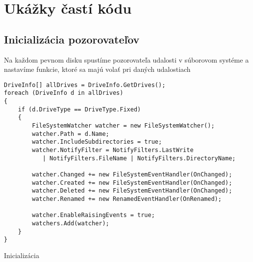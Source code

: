 
\section{Ukážky častí kódu}

\subsection{Inicializácia pozorovateľov}
Na každom pevnom disku spustíme pozorovateľa udalosti v súborovom systéme a nastavíme funkcie, ktoré sa majú volať pri daných udalostiach
\begin{listing}
\begin{verbatim}
DriveInfo[] allDrives = DriveInfo.GetDrives();
foreach (DriveInfo d in allDrives)
{
    if (d.DriveType == DriveType.Fixed) 
    { 
        FileSystemWatcher watcher = new FileSystemWatcher();
        watcher.Path = d.Name;
        watcher.IncludeSubdirectories = true;
        watcher.NotifyFilter = NotifyFilters.LastWrite
           | NotifyFilters.FileName | NotifyFilters.DirectoryName;

        watcher.Changed += new FileSystemEventHandler(OnChanged);
        watcher.Created += new FileSystemEventHandler(OnChanged);
        watcher.Deleted += new FileSystemEventHandler(OnChanged);
        watcher.Renamed += new RenamedEventHandler(OnRenamed);

        watcher.EnableRaisingEvents = true;
        watchers.Add(watcher);
    }
}         
\end{verbatim}
\caption{Inicializácia}
\label{lst:init}
\end{listing}

